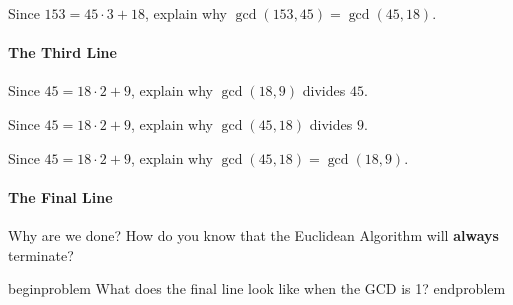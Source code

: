 \documentclass{ximera}
\begin{document}
\begin{problem}
Since $153 = 45\cdot 3 + 18$, explain why $\gcd(153,45) = \gcd(45,18)$.
\end{problem}


\paragraph{The Third Line}
\begin{problem}
Since $45 = 18\cdot 2 + 9$, explain why $\gcd(18,9)$ divides $45$.
\end{problem}

\begin{problem}
Since $45 = 18\cdot 2 + 9$, explain why $\gcd(45,18)$ divides $9$.
\end{problem}

\begin{problem}
Since $45 = 18\cdot 2 + 9$, explain why $\gcd(45,18) = \gcd(18,9)$.
\end{problem}


\paragraph{The Final Line}

\begin{problem}
Why are we done? How do you know that the Euclidean Algorithm
will \textbf{always} terminate?
\end{problem}

begin{problem}
What does the final line look like when the GCD is 1?
end{problem} 
\end{document}
